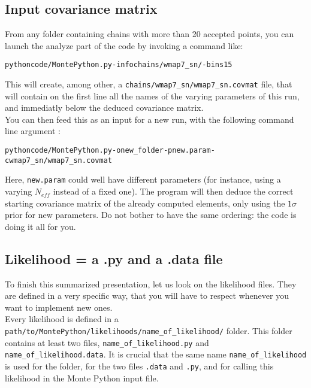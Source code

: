 \documentclass[10pt]{article}
\begin{document}
  \subsection{Input covariance matrix}

  From any folder containing chains with more than 20 accepted points, you can
  launch the analyze part of the code by invoking a command like:
  \begin{alltt}
    python code/MontePython.py -info chains/wmap7_sn/ -bins 15
  \end{alltt}
  This will create, among other, a \verb?chains/wmap7_sn/wmap7_sn.covmat? file,
  that will contain on the first line all the names of the varying parameters
  of this run, and immediatly below the deduced covariance matrix.\\

  You can then feed this as an input for a new run, with the following command
  line argument :
  \begin{alltt}
    python code/MontePython.py -o new_folder -p new.param -c wmap7_sn/wmap7_sn.covmat
  \end{alltt}
  Here, \verb?new.param? could well have different parameters (for
  instance, using a varying $N_{eff}$ instead of a fixed one). The program
  will then deduce the correct starting covariance matrix of the already
  computed elements, only using the $1\sigma$ prior for new parameters. Do not
  bother to have the same ordering: the code is doing it all for you.

  \subsection{Likelihood = a .py and a .data file\label{ssec:lkl}}

  To finish this summarized presentation, let us look on the likelihood files.
  They are defined in a very specific way, that you will have to respect
  whenever you want to implement new ones.\\

  Every likelihood is defined in a
  \verb?path/to/MontePython/likelihoods/name_of_likelihood/?
  folder. This folder contains at least two files, \verb?name_of_likelihood.py?
  and \verb?name_of_likelihood.data?. It is crucial that the same name \verb?name_of_likelihood? is used for the folder,
  for the two files {\tt .data} and {\tt.py}, and for calling this likelihood in the Monte Python input file.\\
\end{document}
